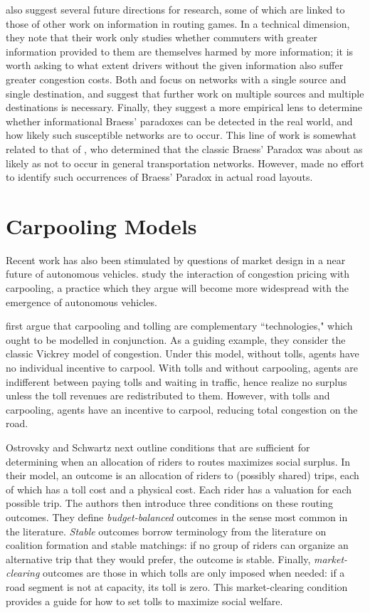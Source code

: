 \documentclass[JEL]{AEA}
\begin{document}
\cite{acemoglu-2016} also suggest several future directions for research, some of which are linked to those of other work on information in routing games. In a technical dimension, they note that their work only studies whether commuters with greater information provided to them are themselves harmed by more information; it is worth asking to what extent drivers without the given information also suffer greater congestion costs. Both \cite{das-2017} and \cite{acemoglu-2016} focus on networks with a single source and single destination, and suggest that further work on multiple sources and multiple destinations is necessary. Finally, they suggest a more empirical lens to determine whether informational Braess' paradoxes can be detected in the real world, and how likely such susceptible networks are to occur. This line of work is somewhat related to that of \cite{steinberg-1983}, who determined that the classic Braess' Paradox was about as likely as not to occur in general transportation networks. However, \cite{steinberg-1983} made no effort to identify such occurrences of Braess' Paradox in actual road layouts.

\section{Carpooling Models}
\label{carpooling-models}

Recent work has also been stimulated by questions of market design in a near future of autonomous vehicles. \cite{ostrovsky-2018} study the interaction of congestion pricing with carpooling, a practice which they argue will become more widespread with the emergence of autonomous vehicles.

\cite{ostrovsky-2018} first argue that carpooling and tolling are complementary ``technologies," which ought to be modelled in conjunction. As a guiding example, they consider the classic Vickrey model of congestion. Under this model, without tolls, agents have no individual incentive to carpool. With tolls and without carpooling, agents are indifferent between paying tolls and waiting in traffic, hence realize no surplus unless the toll revenues are redistributed to them. However, with tolls and carpooling, agents have an incentive to carpool, reducing total congestion on the road.

Ostrovsky and Schwartz next outline conditions that are sufficient for determining when an allocation of riders to routes maximizes social surplus. In their model, an outcome is an allocation of riders to (possibly shared) trips, each of which has a toll cost and a physical cost. Each rider has a valuation for each possible trip. The authors then introduce three conditions on these routing outcomes. They define \textit{budget-balanced} outcomes in the sense most common in the literature. \textit{Stable} outcomes borrow terminology from the literature on coalition formation and stable matchings: if no group of riders can organize an alternative trip that they would prefer, the outcome is stable. Finally, \textit{market-clearing} outcomes are those in which tolls are only imposed when needed: if a road segment is not at capacity, its toll is zero. This market-clearing condition provides a guide for how to set tolls to maximize social welfare. 
\end{document}
